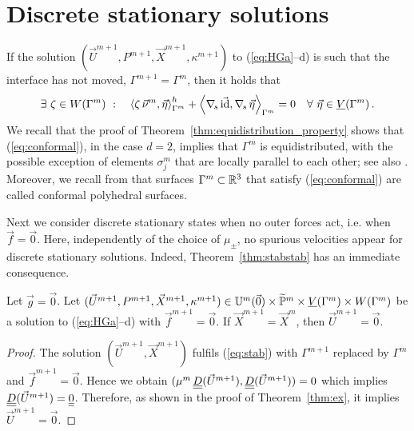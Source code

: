 \section{Discrete stationary solutions}\label{sec:stokes_stationary_solution}
If the solution $(\vec U^{m+1},P^{m+1},\vec X^{m+1}, \kappa^{m+1})$ to
(\ref{eq:HGa}--d) is such that the interface has not moved,
$\Gamma^{m+1} = \Gamma^m$, then it holds that
\begin{equation}\label{eq:conformal}
\exists\ \zeta \in W(\Gamma^m) \ : \quad \left\langle \zeta\,\vec\nu^m, \vec\eta
\right\rangle_{\Gamma^m}^h + \left\langle \nabla_{\!s}\,\vec {\rm id}, \nabla_{\!s}\,\vec \eta
\right\rangle_{\Gamma^m} = 0 \quad \forall\ \vec\eta \in \underline{V}(\Gamma^m) \,.
\end{equation}
We recall that the proof of Theorem~\ref{thm:equidistribution_property}
shows that
(\ref{eq:conformal}), in the case $d=2$, implies that $\Gamma^m$ is
equidistributed, with the possible exception of elements $\sigma^m_j$ that are
locally parallel to each other; see also \cite[Theorem~2.2]{fdfi}. Moreover, we
recall from \cite[\S4.1]{gflows3d} that surfaces $\Gamma^m \subset \mathbb R^3$ that
satisfy (\ref{eq:conformal}) are called conformal polyhedral surfaces.

Next we consider discrete stationary states when no outer forces act, i.e. when
$\vec f = \vec 0$. Here, independently of the choice of $\mu_\pm$, no spurious
velocities appear for discrete stationary solutions. Indeed,
Theorem~\ref{thm:stabstab} has an immediate consequence.
\begin{theorem}\label{thm:stat1}
Let $\vec g=\vec 0$. Let $(\vec U^{m+1},P^{m+1},\vec X^{m+1}, \kappa^{m+1})
\in \mathbb{U}^{m}(\vec{0})\times
\widetilde{\mathbb{P}}^m \times \underline{V}(\Gamma^m) \times W(\Gamma^m)$ be a solution to  (\ref{eq:HGa}--d) with
$\vec f^{m+1} = \vec 0$. If $\vec X^{m+1} = \vec X^m$, then $\vec U^{m+1} = \vec
0$.
\end{theorem}
\begin{proof}
The solution $(\vec U^{m+1}, \vec X^{m+1})$ fulfils (\ref{eq:stab}) with
$\Gamma^{m+1}$ replaced by $\Gamma^m$ and  $\vec f^{m+1} = \vec 0$. Hence we
obtain $(\mu^m\,\mat D (\vec U^{m+1}), \mat D(\vec U^{m+1})) = 0$ which implies
$\mat D(\vec U^{m+1}) = \mat 0$. Therefore, as shown in the proof of
Theorem~\ref{thm:ex}, it implies $\vec U^{m+1} = \vec 0$.
\end{proof}

